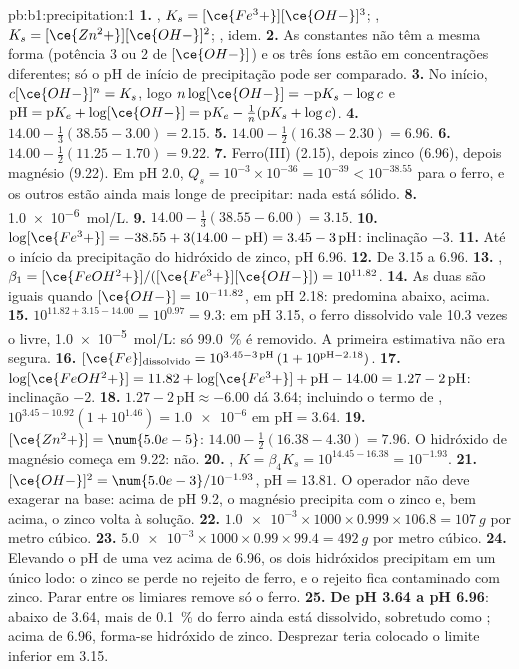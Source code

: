 \begin{solution}{pb:b1:precipitation:1}
\textbf{1.} , $K_s = [\ce{Fe^3+}][\ce{OH-}]^3$;
, $K_s = [\ce{Zn^2+}][\ce{OH-}]^2$;
, idem.
\textbf{2.} As constantes não têm a mesma forma (potência 3 ou 2 de
$[\ce{OH-}]$) e os três íons estão em concentrações diferentes; só o pH
de início de precipitação pode ser comparado.
\textbf{3.} No início, $c[\ce{OH-}]^n = K_s$, logo $n\log[\ce{OH-}] =
-\mathrm{p}K_s - \log c$ e $\mathrm{pH} = \mathrm{p}K_e +
\log[\ce{OH-}] = \mathrm{p}K_e - \frac1n(\mathrm{p}K_s + \log c)$.
\textbf{4.} $14.00 - \frac13(38.55 - 3.00) = 2.15$.
\textbf{5.} $14.00 - \frac12(16.38 - 2.30) = 6.96$.
\textbf{6.} $14.00 - \frac12(11.25 - 1.70) = 9.22$.
\textbf{7.} Ferro(III) (2.15), depois zinco (6.96), depois magnésio (9.22).
Em pH 2.0, $Q_s = 10^{-3} \times 10^{-36} = 10^{-39} < 10^{-38.55}$ para o
ferro, e os outros estão ainda mais longe de precipitar: nada está sólido.
\textbf{8.} \qty{1.0e-6}{mol/L}.
\textbf{9.} $14.00 - \frac13(38.55 - 6.00) = 3.15$.
\textbf{10.} $\log[\ce{Fe^3+}] = -38.55 + 3(14.00 - \mathrm{pH}) = 3.45 -
3\,\mathrm{pH}$: inclinação $-3$.
\textbf{11.} Até o início da precipitação do hidróxido de zinco, pH 6.96.
\textbf{12.} De 3.15 a 6.96.
\textbf{13.} , $\beta_1 =
[\ce{FeOH^2+}]/([\ce{Fe^3+}][\ce{OH-}]) = 10^{11.82}$.
\textbf{14.} As duas são iguais quando $[\ce{OH-}] = 10^{-11.82}$, em pH
2.18:  predomina abaixo,  acima.
\textbf{15.} $10^{11.82 + 3.15 - 14.00} = 10^{0.97} = 9.3$: em pH 3.15, o
ferro dissolvido vale 10.3 vezes o  livre, \qty{1.0e-5}{mol/L}:
só \qty{99.0}{\percent} é removido. A primeira estimativa não era segura.
\textbf{16.} $[\ce{Fe}]_{\mathrm{dissolvido}} = 10^{3.45 - 3\,\mathrm{pH}}\,
(1 + 10^{\mathrm{pH} - 2.18})$.
\textbf{17.} $\log[\ce{FeOH^2+}] = 11.82 + \log[\ce{Fe^3+}] + \mathrm{pH} -
14.00 = 1.27 - 2\,\mathrm{pH}$: inclinação $-2$.
\textbf{18.} $1.27 - 2\,\mathrm{pH} \approx -6.00$ dá 3.64; incluindo o
termo de , $10^{3.45 - 10.92}(1 + 10^{1.46}) =
\num{1.0e-6}$ em $\mathrm{pH} = 3.64$.
\textbf{19.} $[\ce{Zn^2+}] = \num{5.0e-5}$: $14.00 - \frac12(16.38 - 4.30) =
7.96$. O hidróxido de magnésio começa em 9.22: não.
\textbf{20.} , $K = \beta_4 K_s =
10^{14.45 - 16.38} = 10^{-1.93}$.
\textbf{21.} $[\ce{OH-}]^2 = \num{5.0e-3}/10^{-1.93}$, $\mathrm{pH} =
13.81$. O operador não deve exagerar na base: acima de pH 9.2, o
magnésio precipita com o zinco e, bem acima, o zinco volta à solução.
\textbf{22.} $\num{1.0e-3} \times 1000 \times 0.999 \times 106.8 =
\qty{107}{g}$ por metro cúbico.
\textbf{23.} $\num{5.0e-3} \times 1000 \times 0.99 \times 99.4 =
\qty{492}{g}$ por metro cúbico.
\textbf{24.} Elevando o pH de uma vez acima de 6.96, os dois hidróxidos
precipitam em um único lodo: o zinco se perde no rejeito de ferro, e o
rejeito fica contaminado com zinco. Parar entre os limiares remove só o
ferro.
\textbf{25.} \textbf{De pH 3.64 a pH 6.96}: abaixo de 3.64, mais de
\qty{0.1}{\percent} do ferro ainda está dissolvido, sobretudo como
; acima de 6.96, forma-se hidróxido de zinco. Desprezar
 teria colocado o limite inferior em 3.15.
\end{solution}
